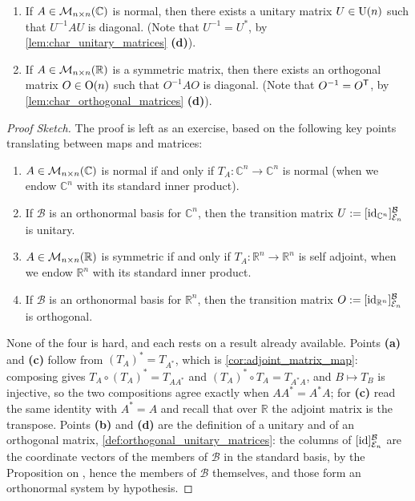 \begin{theorem}
\label{thm:spectral_thm_matrices}
\begin{enumerate}[label=\textbf{(\alph*)}]
    \item If $A \in \mathcal{M}_{n \times n}(\mathbb{C})$ is normal, then there exists a unitary matrix $U \in \operatorname{U}(n)$ such that $U^{-1} A U$ is diagonal. (Note that $U^{-1} = U^*$, by \cref{lem:char_unitary_matrices} \textbf{(d)}).
    \item If $A \in \mathcal{M}_{n \times n}(\mathbb{R})$ is a symmetric matrix, then there exists an orthogonal matrix $O \in \operatorname{O}(n)$ such that $O^{-1} A O$ is diagonal. (Note that $O^{-1} = O^{\mathsf{T}}$, by \cref{lem:char_orthogonal_matrices} \textbf{(d)}).
\end{enumerate}
\end{theorem}

\begin{proof}[Proof Sketch]
The proof is left as an exercise, based on the following key points translating between maps and matrices:
\begin{enumerate}[label=\textbf{(\alph*)}]
    \item $A \in \mathcal{M}_{n \times n}(\mathbb{C})$ is normal if and only if $T_A \colon \mathbb{C}^n \to \mathbb{C}^n$ is normal (when we endow $\mathbb{C}^n$ with its standard inner product).
    \item If $\mathcal{B}$ is an orthonormal basis for $\mathbb{C}^n$, then the transition matrix $U := [\operatorname{id}_{\mathbb{C}^n}]_{\mathcal{E}_n}^{\mathcal{B}}$ is unitary.
    \item $A \in \mathcal{M}_{n \times n}(\mathbb{R})$ is symmetric if and only if $T_A \colon \mathbb{R}^n \to \mathbb{R}^n$ is self adjoint, when we endow $\mathbb{R}^n$ with its standard inner product.
    \item If $\mathcal{B}$ is an orthonormal basis for $\mathbb{R}^n$, then the transition matrix $O := [\operatorname{id}_{\mathbb{R}^n}]_{\mathcal{E}_n}^{\mathcal{B}}$ is orthogonal.
\end{enumerate}
None of the four is hard, and each rests on a result already available. Points \textbf{(a)} and \textbf{(c)} follow from $(T_A)^* = T_{A^*}$, which is \cref{cor:adjoint_matrix_map}: composing gives $T_A \circ (T_A)^* = T_{A A^*}$ and $(T_A)^* \circ T_A = T_{A^* A}$, and $B \mapsto T_B$ is injective, so the two compositions agree exactly when $A A^* = A^* A$; for \textbf{(c)} read the same identity with $A^* = A$ and recall that over $\mathbb{R}$ the adjoint matrix is the transpose. Points \textbf{(b)} and \textbf{(d)} are the definition of a unitary and of an orthogonal matrix, \cref{def:orthogonal_unitary_matrices}: the columns of $[\operatorname{id}]_{\mathcal{E}_n}^{\mathcal{B}}$ are the coordinate vectors of the members of $\mathcal{B}$ in the standard basis, by the Proposition on , hence the members of $\mathcal{B}$ themselves, and those form an orthonormal system by hypothesis.
\end{proof}

